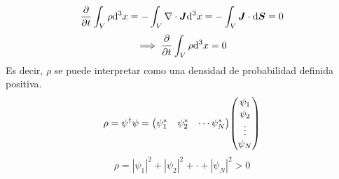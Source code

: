 \begin{equation}
  \pdv{t}\int_V\rho\dd^3x=-\int_V\nabla\cdot\vb*{J}\dd^3x=-\int_V\vb*{J}\cdot\dd\vb*{S}=0
\end{equation}
\begin{equation}
  \implies \pdv{t}\int_V\rho\dd^3x=0
\end{equation}
Es decir, $\rho$ se puede interpretar como una densidad de probabilidad definida positiva.
\begin{equation}
  \rho=\psi^\dagger\psi=\mqty(\psi_1^*&\psi_2^*&\cdots \psi_N^*)\mqty(\psi_1\\\psi_2\\\vdots\\\psi_N)
\end{equation}
\begin{equation}
  \rho=|\psi_1|^2+|\psi_2|^2+\cdot +|\psi_N|^2>0
\end{equation}

